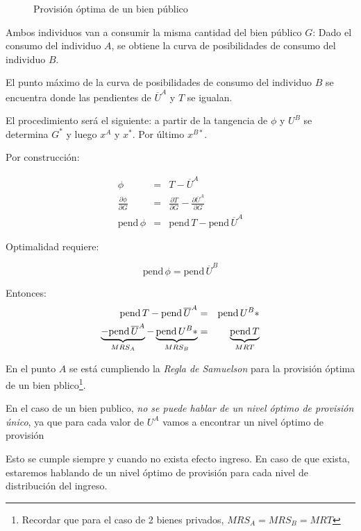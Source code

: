 \begin{center}
\begin{figure}[H]
\caption{Provisión óptima de un bien público}
% 
\label{fig:grafico4}
% 
\end{figure}
\end{center}

Ambos individuos van a consumir la misma cantidad del bien público $G$: Dado el consumo del individuo $A$, se obtiene la curva de posibilidades de consumo del individuo $B$.

El punto máximo de la curva de posibilidades de consumo del individuo $B$ se encuentra donde las pendientes de $\overline{U}^A$  y $T$ se igualan.

El procedimiento será el siguiente: a partir de la tangencia de $\phi$ y $U^B$ se determina $G^*$ y luego $x^A$ y $x^*$. Por último $x^{B*}$.

Por construcción:

\begin{eqnarray}
	\phi &=& T - \overline{U}^A \\
	\frac{\partial \phi}{\partial G} &=& \frac{\partial T}{\partial G} - \frac{\partial \overline{U}^A}{\partial G} \\
	\mbox{pend} \, \phi &=& \mbox{pend}\, T-\mbox{pend} \, \overline{U}^A
\end{eqnarray}

Optimalidad requiere:

$$\mbox{pend} \, \phi=\mbox{pend} \, \overline{U}^B$$

Entonces:
\begin{eqnarray}
	\mbox{pend} \, T-\mbox{pend} \, \overline{U}^A &=& \mbox{pend} \,U^B* \nonumber \\
	\underbrace{-\mbox{pend} \, \overline{U}^A}_{MRS_A}-\underbrace{\mbox{pend} \,U^B*}_{MRS_B} &=& \underbrace{\mbox{pend} \, T}_{MRT} \nonumber
\end{eqnarray}

En el punto $A$ se está cumpliendo la \emph{Regla de Samuelson} para la provisión óptima de un bien pblico\footnote{Recordar que para el caso de 2 bienes privados, $MRS_A=MRS_B=MRT$}.

En el caso de un bien publico, \emph{no se puede hablar de un nivel óptimo de provisión único}, ya que para cada valor de $U^A$ vamos a encontrar un nivel óptimo de provisión

Esto se cumple siempre y cuando no exista efecto ingreso. En caso de que exista, estaremos hablando de un nivel óptimo de provisión para cada nivel de distribución del ingreso.


